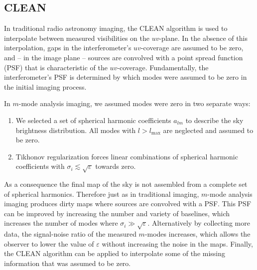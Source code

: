 \documentclass[twocolumn]{aastex61}
\begin{document}
\subsection{CLEAN}\label{sec:clean}

In traditional radio astronomy imaging, the CLEAN algorithm \citep{1974A&AS...15..417H} is used to
interpolate between measured visibilities on the $uv$-plane. In the absence of this interpolation,
gaps in the interferometer's $uv$-coverage are assumed to be zero, and -- in the image plane --
sources are convolved with a point spread function (PSF) that is characteristic of the
$uv$-coverage.  Fundamentally, the interferometer's PSF is determined by which modes were assumed to
be zero in the initial imaging process.

In $m$-mode analysis imaging, we assumed modes were zero in two separate ways:
\begin{enumerate}
    \item We selected a set of spherical harmonic coefficients $a_{lm}$ to describe the sky
        brightness distribution. All modes with $l>l_\text{max}$ are neglected and assumed to be
        zero.
    \item Tikhonov regularization forces linear combinations of spherical harmonic coefficients with
        $\sigma_i \lesssim \sqrt{\varepsilon}$ towards zero.
\end{enumerate}
As a consequence the final map of the sky is not assembled from a complete set of spherical
harmonics. Therefore just as in traditional imaging, $m$-mode analysis imaging produces dirty maps
where sources are convolved with a PSF.  This PSF can be improved by increasing the number and
variety of baselines, which increases the number of modes where $\sigma_i \gg \sqrt{\varepsilon}$.
Alternatively by collecting more data, the signal-noise ratio of the measured $m$-modes increases,
which allows the observer to lower the value of $\varepsilon$ without increasing the noise in the
maps.  Finally, the CLEAN algorithm can be applied to interpolate some of the missing information
that was assumed to be zero.
\end{document}
